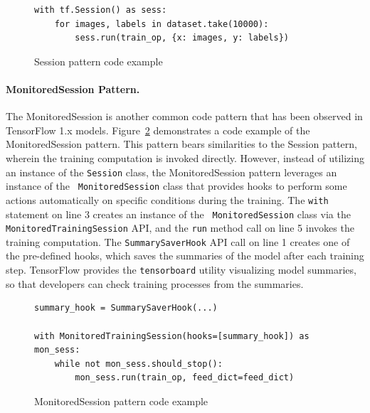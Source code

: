 \begin{figure}[!ht]
\begin{lstlisting}[style=mpython]
with tf.Session() as sess:
    for images, labels in dataset.take(10000):
        sess.run(train_op, {x: images, y: labels})
\end{lstlisting}
\caption{Session pattern code example}
\label{fig:sessionpattern}
\end{figure}
\vspace{-1em} 




\paragraph{MonitoredSession Pattern.}
The MonitoredSession is another common code pattern that has been observed in
TensorFlow 1.x models. 
Figure~\ref{fig:monsesspattern} demonstrates a code example of the
MonitoredSession pattern.
This pattern bears similarities to the Session pattern, wherein the training
computation is invoked directly.
However, instead of utilizing an instance of the {\tt Session} class, the
MonitoredSession pattern leverages an instance of the {\tt
MonitoredSession} class that provides hooks to perform some actions
automatically on specific conditions during the training.
The {\tt with} statement on line 3 creates an instance of the {\tt
MonitoredSession} class via the {\tt MonitoredTrainingSession} API, and the
{\tt run} method call on line 5 invokes the training computation.
The {\tt SummarySaverHook} API call on line 1 creates one of the pre-defined
hooks, which saves the summaries of the model after each training step. 
TensorFlow provides the {\tt tensorboard} utility visualizing model summaries,
so that developers can check training processes from the summaries.
\vspace{-1em} 

\begin{figure}[!ht]
  \begin{lstlisting}[style=mpython]
summary_hook = SummarySaverHook(...)

with MonitoredTrainingSession(hooks=[summary_hook]) as mon_sess:
    while not mon_sess.should_stop():
        mon_sess.run(train_op, feed_dict=feed_dict)\end{lstlisting}
  \caption{MonitoredSession pattern code example}
  \label{fig:monsesspattern}
\end{figure}

